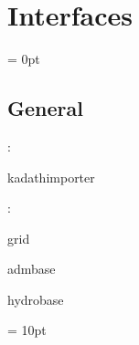 
\section{Interfaces} 


\parskip = 0pt

\vspace{3mm} \subsection*{General}

: 

kadathimporter
\vspace{2mm}

: 

grid

admbase

hydrobase
\vspace{2mm}

\vspace{5mm}\parskip = 10pt 
